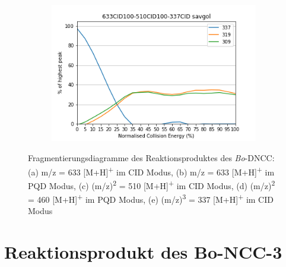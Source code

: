 \begin{figure}[!htbp]
  \begin{subfigure}[b]{0.5\textwidth}
    \includegraphics[width=\textwidth]{content/Anhang/ESIMS/RP_Bo-DNCC/633CID100-510CID100-337CID-337savgol.png}
    \caption{}
  \end{subfigure}
  
  \caption[Fragmentierungsdiagramme des Reaktionsproduktes des \textit{Bo}-DNCC, Quelle: Autor]{Fragmentierungsdiagramme des Reaktionsproduktes des \textit{Bo}-DNCC: (a) m/z = 633 [M+H]\textsuperscript{+} im CID Modus, (b) m/z = 633 [M+H]\textsuperscript{+} im PQD Modus, (c) (m/z)\textsuperscript{2} = 510 [M+H]\textsuperscript{+} im CID Modus, (d) (m/z)\textsuperscript{2} = 460 [M+H]\textsuperscript{+} im PQD Modus, (e) (m/z)\textsuperscript{3} = 337 [M+H]\textsuperscript{+} im CID Modus}
\end{figure}

\pagebreak
\section{Reaktionsprodukt des Bo-NCC-3}

